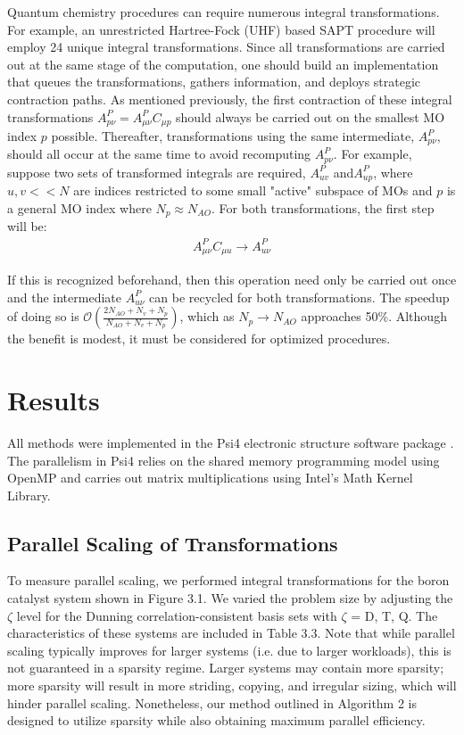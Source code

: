 Quantum chemistry procedures can require numerous integral transformations. For example, an unrestricted Hartree-Fock (UHF) based SAPT
procedure will employ
24 unique integral transformations. Since all transformations are carried out at the same stage of the computation, one should build an 
implementation that queues the transformations, gathers information, and deploys strategic contraction paths.
As mentioned previously, the first contraction of these integral transformations $A_{p \nu}^P=A_{\mu \nu}^PC_{\mu p}$ 
should always be carried out on the smallest MO index $p$ 
possible. Thereafter, transformations using the same intermediate, $A_{p \nu}^P$, should all occur at the same time to avoid
recomputing $A_{p \nu}^P$. 
For example, suppose two sets of transformed integrals are required, $A^P_{u v}$ and$A^P_{up}$, where $u,v << N$ are
indices restricted to some small "active" subspace of MOs
and $p$ is a general MO index where $N_p \approx N_{AO}$. For both transformations, the first step will be:
\begin{align} 
A^P_{\mu \nu}C_{\mu u} \rightarrow A^P_{u \nu} 
\end{align}

\noindent If this is recognized beforehand, then this operation need only be carried out once and 
the intermediate $A^P_{u \nu}$ can be recycled
for both transformations. The speedup of doing so is $\mathcal{O}(\frac{2N_{AO} + N_v + N_p}{N_{AO} + N_v + N_p})$, 
which as $N_p \rightarrow N_{AO}$ approaches
50\%. Although the benefit is modest, it must be considered for optimized procedures.

\section{Results}

All methods were implemented in the {\sc Psi4} electronic structure software package \cite{Parrish:2017:3185}.
The parallelism in {\sc Psi4} relies on the shared memory programming model using OpenMP 
and carries out matrix multiplications using Intel's Math Kernel
Library. 


\subsection{Parallel Scaling of Transformations}

To measure parallel scaling, we performed integral transformations for the boron catalyst system shown in Figure 3.1. 
We varied the problem size by adjusting the $\zeta$ level for the Dunning correlation-consistent basis sets with $\zeta$ = D, T, Q.
The characteristics of these systems are included in Table 3.3. Note that while parallel scaling typically improves
for larger systems (i.e. due to larger workloads),
this is not guaranteed in a sparsity regime. Larger systems may contain more sparsity;
more sparsity will result in more striding, copying, and irregular sizing,
which will hinder parallel scaling. Nonetheless, our method outlined in Algorithm 2 is designed to utilize sparsity while also
obtaining maximum parallel efficiency. 

